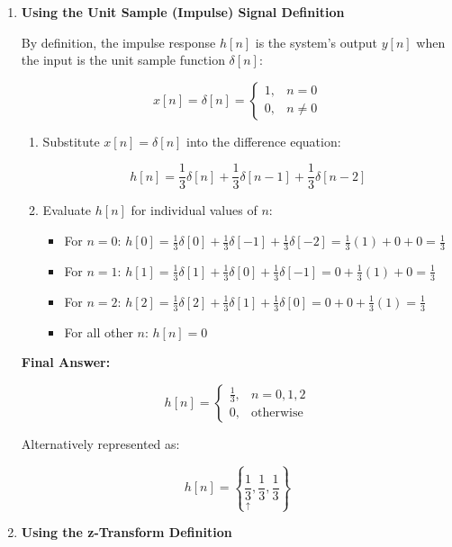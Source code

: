 \begin{enumerate}
\def\labelenumi{\arabic{enumi}.}
\item
  \textbf{Using the Unit Sample (Impulse) Signal Definition}

  By definition, the impulse response \(h[n]\) is the system's output
  \(y[n]\) when the input is the unit sample function \(\delta[n]\):

  \[x[n] = \delta[n] = \begin{cases} 1, & n = 0 \\ 0, & n \neq 0 \end{cases}\]

  \begin{enumerate}
  \def\labelenumii{\arabic{enumii}.}
  \item
    Substitute \(x[n] = \delta[n]\) into the difference equation:

    \[h[n] = \frac{1}{3}\delta[n] + \frac{1}{3}\delta[n-1] + \frac{1}{3}\delta[n-2]\]
  \item
    Evaluate \(h[n]\) for individual values of \(n\):

    \begin{itemize}
    \item
      For \(n = 0\):
      \(h[0] = \frac{1}{3}\delta[0] + \frac{1}{3}\delta[-1] + \frac{1}{3}\delta[-2] = \frac{1}{3}(1) + 0 + 0 = \frac{1}{3}\)
    \item
      For \(n = 1\):
      \(h[1] = \frac{1}{3}\delta[1] + \frac{1}{3}\delta[0] + \frac{1}{3}\delta[-1] = 0 + \frac{1}{3}(1) + 0 = \frac{1}{3}\)
    \item
      For \(n = 2\):
      \(h[2] = \frac{1}{3}\delta[2] + \frac{1}{3}\delta[1] + \frac{1}{3}\delta[0] = 0 + 0 + \frac{1}{3}(1) = \frac{1}{3}\)
    \item
      For all other \(n\): \(h[n] = 0\)
    \end{itemize}
  \end{enumerate}

  \textbf{Final Answer:}

  \[h[n] = \begin{cases} \frac{1}{3}, & n = 0, 1, 2 \\ 0, & \text{otherwise} \end{cases}\]

  Alternatively represented as:

  \[h[n] = \left\{ \underset{\uparrow}{\frac{1}{3}}, \frac{1}{3}, \frac{1}{3} \right\}\]
\item
  \textbf{Using the z-Transform Definition}


\end{enumerate}
